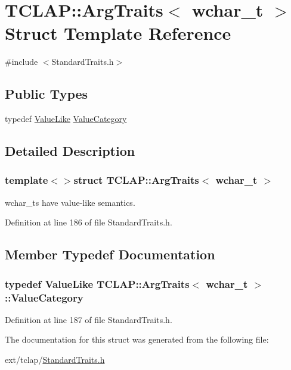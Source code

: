 \hypertarget{struct_t_c_l_a_p_1_1_arg_traits_3_01wchar__t_01_4}{}\section{T\+C\+L\+A\+P\+:\+:Arg\+Traits$<$ wchar\+\_\+t $>$ Struct Template Reference}
\label{struct_t_c_l_a_p_1_1_arg_traits_3_01wchar__t_01_4}


{\ttfamily \#include $<$Standard\+Traits.\+h$>$}

\subsection*{Public Types}
\begin{DoxyCompactItemize}
\item 
typedef \hyperlink{struct_t_c_l_a_p_1_1_value_like}{Value\+Like} \hyperlink{struct_t_c_l_a_p_1_1_arg_traits_3_01wchar__t_01_4_a49a311297a394637af4d8d64eda7f442}{Value\+Category}
\end{DoxyCompactItemize}


\subsection{Detailed Description}
\subsubsection*{template$<$$>$struct T\+C\+L\+A\+P\+::\+Arg\+Traits$<$ wchar\+\_\+t $>$}

wchar\+\_\+ts have value-\/like semantics. 

Definition at line 186 of file Standard\+Traits.\+h.



\subsection{Member Typedef Documentation}
\hypertarget{struct_t_c_l_a_p_1_1_arg_traits_3_01wchar__t_01_4_a49a311297a394637af4d8d64eda7f442}{}
\subsubsection[{Value\+Category}]{\setlength{\rightskip}{0pt plus 5cm}typedef {\bf Value\+Like} {\bf T\+C\+L\+A\+P\+::\+Arg\+Traits}$<$ wchar\+\_\+t $>$\+::{\bf Value\+Category}}\label{struct_t_c_l_a_p_1_1_arg_traits_3_01wchar__t_01_4_a49a311297a394637af4d8d64eda7f442}


Definition at line 187 of file Standard\+Traits.\+h.



The documentation for this struct was generated from the following file\+:\begin{DoxyCompactItemize}
\item 
ext/tclap/\hyperlink{_standard_traits_8h}{Standard\+Traits.\+h}\end{DoxyCompactItemize}
